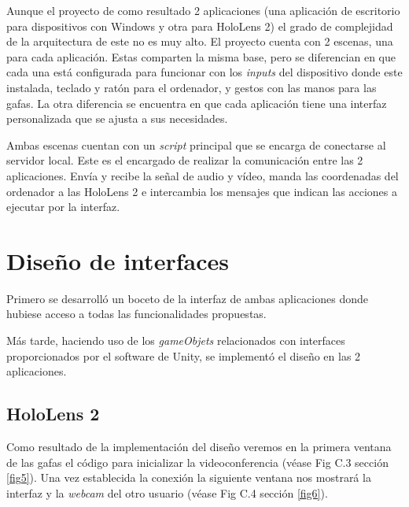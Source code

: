 Aunque el proyecto de como resultado 2 aplicaciones (una aplicación de escritorio para dispositivos con Windows y otra para HoloLens 2) el grado de complejidad de la arquitectura de este no es muy alto. El proyecto cuenta con 2 escenas, una para cada aplicación. Estas comparten la misma base, pero se diferencian en que cada una está configurada para funcionar con los \textit{inputs} del dispositivo donde este instalada, teclado y ratón para el ordenador, y gestos con las manos para las gafas. La otra diferencia se encuentra en que cada aplicación tiene una interfaz personalizada que se ajusta a sus necesidades.

Ambas escenas cuentan con un \textit{script} principal que se encarga de conectarse al servidor local. Este es el encargado de realizar la comunicación entre las 2 aplicaciones. Envía y recibe la señal de audio y vídeo, manda las coordenadas del ordenador a las HoloLens 2 e intercambia los mensajes que indican las acciones a ejecutar por la interfaz.


\section{Diseño de interfaces}

Primero se desarrolló un boceto de la interfaz de ambas aplicaciones donde hubiese acceso a todas las funcionalidades propuestas.


Más tarde, haciendo uso de los \textit{gameObjets} relacionados con interfaces proporcionados por el software de Unity, se implementó el diseño en las 2 aplicaciones.
\newpage
\subsection{HoloLens 2}
Como resultado de la implementación del diseño veremos en la primera ventana de las gafas el código para inicializar la videoconferencia (véase Fig C.3 sección \ref{fig5}).
\label{fig5}
Una vez establecida la conexión la siguiente ventana nos mostrará la interfaz y la \textit{webcam} del otro usuario (véase Fig C.4 sección \ref{fig6}).
\label{fig6}
\newpage
